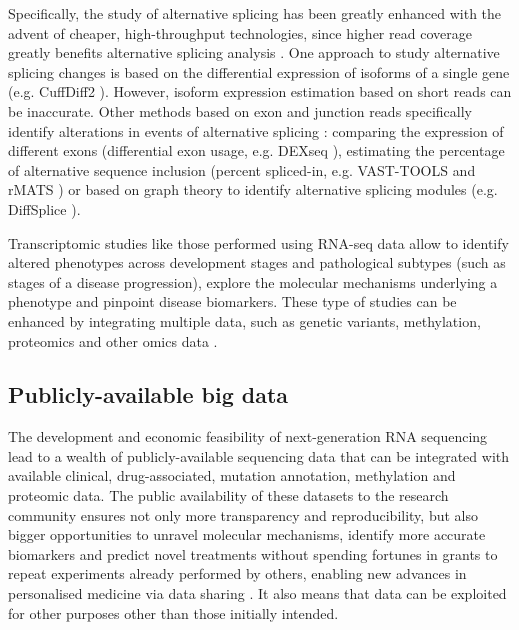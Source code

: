 Specifically, the study of alternative splicing has been greatly enhanced with the advent of cheaper, high-throughput technologies, since higher read coverage greatly benefits alternative splicing analysis \cite{}. %
One approach to study alternative splicing changes is based on the differential expression of isoforms of a single gene (e.g. CuffDiff2 \cite{trapnell:2013uv}). However, isoform expression estimation based on short reads can be inaccurate. %
Other methods based on exon and junction reads specifically identify alterations in events of alternative splicing \cite{conesa:2016vw}: comparing the expression of different exons (differential exon usage, e.g. DEXseq \cite{li:2015tn}), estimating the percentage of alternative sequence inclusion (percent spliced-in, e.g. VAST-TOOLS \cite{irimia:2014wt,tapial:2017ui} and rMATS \cite{shen:2014tk}) or based on graph theory to identify alternative splicing modules (e.g. DiffSplice \cite{hu:2012uw}).


Transcriptomic studies like those performed using RNA-seq data allow to identify altered phenotypes across development stages and pathological subtypes (such as stages of a disease progression), explore the molecular mechanisms underlying a phenotype and pinpoint disease biomarkers. These type of studies can be enhanced by integrating multiple data, such as genetic variants, methylation, proteomics and other omics data \cite{chang:2013ww,perez-riverol:2019uk}.

\subsection{Publicly-available big data}

The development and economic feasibility of next-generation RNA sequencing lead to a wealth of publicly-available sequencing data that can be integrated with available clinical, drug-associated, mutation annotation, methylation and proteomic data. The public availability of these datasets to the research community ensures not only more transparency and reproducibility, but also bigger opportunities to unravel molecular mechanisms, identify more accurate biomarkers and predict novel treatments without spending fortunes in grants to repeat experiments already performed by others, enabling new advances in personalised medicine via data sharing \cite{rockhold:2019ws}. It also means that data can be exploited for other purposes other than those initially intended.

